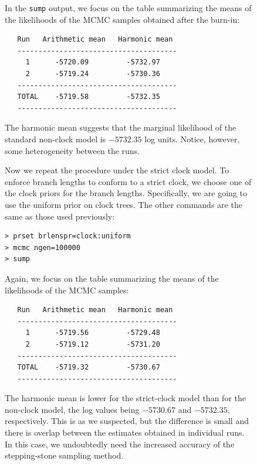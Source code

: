 \documentclass[12pt]{book}
\newcommand{\ttt}[1]{\texttt{#1}}
\begin{document}
\begin{figure}[h]
In the \ttt{sump} output, we focus on the table summarizing the means of the likelihoods of the
MCMC samples obtained after the burn-in:

\begin{singlespacing}
\footnotesize
\begin{verbatim}
   Run   Arithmetic mean   Harmonic mean
   --------------------------------------
     1      -5720.09         -5732.97
     2      -5719.24         -5730.36
   --------------------------------------
   TOTAL    -5719.58         -5732.35
   --------------------------------------
\end{verbatim}
\end{singlespacing}
\normalsize

The harmonic mean suggests that the marginal likelihood of the standard non-clock model is
$-5732.35$ log units. Notice, however, some heterogeneity between the runs.

Now we repeat the procedure under the strict clock model. To enforce branch lengths to conform to a
strict clock, we choose one of the clock priors for the branch lengths. Specifically, we are going
to use the uniform prior on clock trees. The other commands are the same as those used previously:

\begin{singlespacing}
\small
\begin{verbatim}
> prset brlenspr=clock:uniform
> mcmc ngen=100000
> sump
\end{verbatim}
\end{singlespacing}
\normalsize

Again, we focus on the table summarizing the means of the likelihoods of the MCMC samples:

\begin{singlespacing}
\footnotesize
\begin{verbatim}
   Run   Arithmetic mean   Harmonic mean
   --------------------------------------
     1      -5719.56         -5729.48
     2      -5719.12         -5731.20
   --------------------------------------
   TOTAL    -5719.32         -5730.67
   --------------------------------------
\end{verbatim}
\end{singlespacing}
\normalsize

The harmonic mean is lower for the strict-clock model than for the non-clock model, the log values
being $-5730.67$ and $-5732.35$, respectively. This is as we suspected, but the difference is small
and there is overlap between the estimates obtained in individual runs. In this case, we
undoubtedly need the increased accuracy of the stepping-stone sampling method.


\end{figure}
\end{document}
